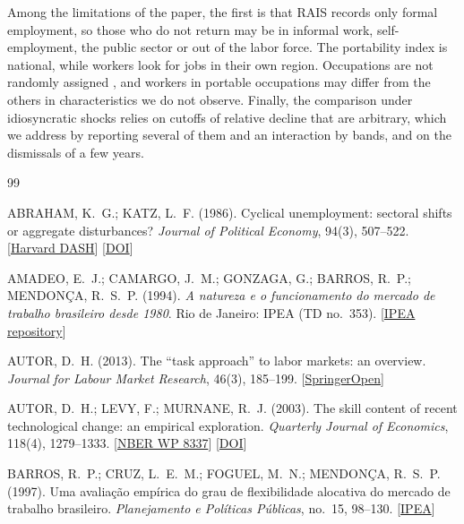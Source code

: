 \documentclass[11pt,a4paper]{article}
\let\citeporig\citep
\renewcommand{\citep}[1]{{\color{citeblue}\citeporig{#1}}}
\begin{document}
Among the limitations of the paper, the first is that RAIS records only formal employment, so those who do not return may be in informal work, self-employment, the public sector or out of the labor force. The portability index is national, while workers look for jobs in their own region. Occupations are not randomly assigned \citep{roy1951}, and workers in portable occupations may differ from the others in characteristics we do not observe. Finally, the comparison under idiosyncratic shocks relies on cutoffs of relative decline that are arbitrary, which we address by reporting several of them and an interaction by bands, and on the dismissals of a few years.

\FloatBarrier
{\singlespacing\setlength{\bibsep}{0pt}\setlength{\parskip}{0pt}\hypersetup{urlcolor=black}
\begin{thebibliography}{99}
\scriptsize

ABRAHAM, K.~G.; KATZ, L.~F. (1986). Cyclical unemployment: sectoral shifts or aggregate disturbances? \textit{Journal of Political Economy}, 94(3), 507--522. [\href{https://dash.harvard.edu/bitstreams/7312037c-839f-6bd4-e053-0100007fdf3b/download}{Harvard DASH}] [\href{https://doi.org/10.1086/261387}{DOI}]

AMADEO, E.~J.; CAMARGO, J.~M.; GONZAGA, G.; BARROS, R.~P.; MENDON\c{C}A, R.~S.~P. (1994). \textit{A natureza e o funcionamento do mercado de trabalho brasileiro desde 1980}. Rio de Janeiro: IPEA (TD no.~353). [\href{https://repositorio.ipea.gov.br/handle/11058/2464}{IPEA repository}]

AUTOR, D.~H. (2013). The ``task approach'' to labor markets: an overview. \textit{Journal for Labour Market Research}, 46(3), 185--199. [\href{https://doi.org/10.1007/s12651-013-0128-z}{SpringerOpen}]

AUTOR, D.~H.; LEVY, F.; MURNANE, R.~J. (2003). The skill content of recent technological change: an empirical exploration. \textit{Quarterly Journal of Economics}, 118(4), 1279--1333. [\href{https://www.nber.org/papers/w8337}{NBER WP 8337}] [\href{https://doi.org/10.1162/003355303322552801}{DOI}]

BARROS, R.~P.; CRUZ, L.~E.~M.; FOGUEL, M.~N.; MENDON\c{C}A, R.~S.~P. (1997). Uma avalia\c{c}\~ao emp\'irica do grau de flexibilidade alocativa do mercado de trabalho brasileiro. \textit{Planejamento e Pol\'iticas P\'ublicas}, no.~15, 98--130. [\href{https://www.ipea.gov.br/ppp/index.php/PPP/article/view/124}{IPEA}]


\end{thebibliography}}
\end{document}
